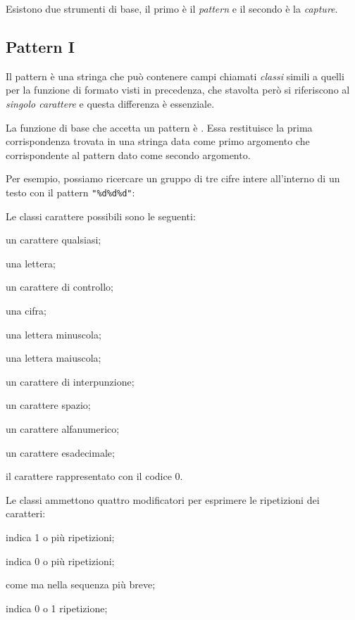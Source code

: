 Esistono due strumenti di base, il primo è il \emph{pattern} e il secondo è la
\emph{capture}.


\subsection{Pattern I}
\label{iiSecPattern}

Il pattern è una stringa che può contenere campi chiamati \emph{classi} simili
a quelli per la funzione di formato visti in precedenza, che stavolta però si
riferiscono al \emph{singolo carattere} e questa differenza è essenziale.

La funzione di base che accetta un pattern è
. Essa restituisce la prima corrispondenza
trovata in una stringa data come primo argomento che corrispondente al pattern
dato come secondo argomento.

Per esempio, possiamo ricercare un gruppo di tre cifre intere all'interno di un
testo con il pattern \verb|"%d%d%d"|:

Le classi carattere possibili sono le seguenti:
\begin{compactdescription}
  \item[\key{.}] un carattere qualsiasi;
  \item[\key{\%a}] una lettera;
  \item[\key{\%c}] un carattere di controllo;
  \item[\key{\%d}] una cifra;
  \item[\key{\%l}] una lettera minuscola;
  \item[\key{\%u}] una lettera maiuscola;
  \item[\key{\%p}] un carattere di interpunzione;
  \item[\key{\%s}] un carattere spazio;
  \item[\key{\%w}] un carattere alfanumerico;
  \item[\key{\%x}] un carattere esadecimale;
  \item[\key{\%z}] il carattere rappresentato con il codice 0.
\end{compactdescription}

Le classi ammettono quattro modificatori per esprimere le ripetizioni dei
caratteri:
\begin{compactdescription}
  \item[\key{+}] indica 1 o più ripetizioni;
  \item[\key{*}] indica 0 o più ripetizioni;
  \item[\key{-}] come \key{*} ma nella sequenza più breve;
  \item[\key{?}] indica 0 o 1 ripetizione;
\end{compactdescription}

